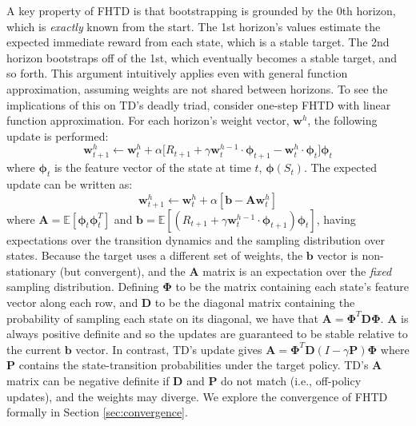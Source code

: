 \documentclass[letterpaper]{article} %
\newcommand{\params}{\mathbf{w}}
\newcommand{\Features}{\bm{\Phi}}
\newcommand{\features}{\bm{\phi}}
\begin{document}
A key property of FHTD is that bootstrapping is grounded by the 0th horizon, which is \textit{exactly} known from the start. The 1st horizon's values estimate the expected immediate reward from each state, which is a stable target. The 2nd horizon bootstraps off of the 1st, which eventually becomes a stable target, and so forth. This argument intuitively applies even with general function approximation, assuming weights are not shared between horizons. To see the implications of this on TD's deadly triad, consider one-step FHTD with linear function approximation. For each horizon's weight vector, $\params^h$, the following update is performed:
\begin{equation*}
    \params^h_{t+1} \leftarrow \params^h_{t} + \alpha \big[R_{t+1} + \gamma \params^{h-1}_{t} \cdot \features_{t+1} - \params^h_t \cdot \features_t \big] \features_t
\end{equation*}
where $\features_t$ is the feature vector of the state at time $t$, $\features(S_t)$. The expected update can be written as:
\begin{equation*}
    \params^h_{t+1} \leftarrow \params^h_t + \alpha [\mathbf{b} - \mathbf{A} \params^h_t]
\end{equation*}
where $\mathbf{A} = \mathbb{E}[\features_t\features_t^T]$ and $\mathbf{b} = \mathbb{E}[(R_{t+1} + \gamma  \params^{h-1}_t \cdot \features_{t+1}) \features_t]$, having expectations over the transition dynamics and the sampling distribution over states.
Because the target uses a different set of weights, the $\mathbf{b}$ vector is non-stationary (but convergent), and the $\mathbf{A}$ matrix is an expectation over the \textit{fixed} sampling distribution.
Defining $\Features$ to be the matrix containing each state's feature vector along each row, and $\mathbf{D}$ to be the diagonal matrix containing the probability of sampling each state on its diagonal, we have that $\mathbf{A} = \Features^T \mathbf{D} \Features$. $\mathbf{A}$ is always positive definite and so the updates are guaranteed to be stable relative to the current $\mathbf{b}$ vector. In contrast, TD's update gives $\mathbf{A} = \Features^T \mathbf{D} (I - \gamma \mathbf{P}) \Features$ where $\mathbf{P}$ contains the state-transition probabilities under the target policy.
TD's $\mathbf{A}$ matrix can be negative definite if $\mathbf{D}$ and $\mathbf{P}$ do not match (i.e., off-policy updates), and the weights may diverge. We explore the convergence of FHTD formally in Section \ref{sec:convergence}.
\end{document}
